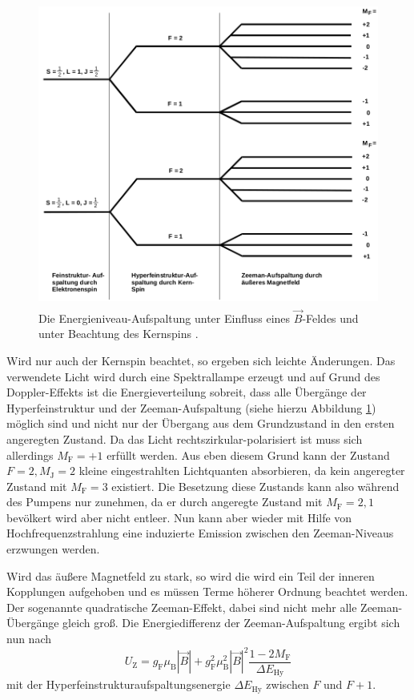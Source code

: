 \begin{figure}
  \centering
  \includegraphics[height=10cm]{content/pictures/Energieniveaus2.png}
  \caption{Die Energieniveau-Aufspaltung unter Einfluss eines $\vec{B}$-Feldes und unter Beachtung des Kernspins \cite{anleitung}.}
  \label{fig:aufspaltung2}
\end{figure}
Wird nur auch der Kernspin beachtet, so ergeben sich leichte Änderungen. Das verwendete Licht wird durch eine Spektrallampe erzeugt und 
auf Grund des Doppler-Effekts ist die Energieverteilung sobreit, dass alle Übergänge der 
Hyperfeinstruktur und der Zeeman-Aufspaltung (siehe hierzu Abbildung \ref{fig:aufspaltung2}) möglich sind und nicht nur der Übergang aus
dem Grundzustand in den ersten angeregten Zustand. Da das Licht rechtszirkular-polarisiert ist
muss sich allerdings $M_\text{F} = +1$ erfüllt werden. Aus eben diesem Grund kann der Zustand $F = 2, M_\text{J} = 2$ kleine
eingestrahlten Lichtquanten absorbieren, da kein angeregter Zustand mit $M_\text{F} = 3$ existiert. Die Besetzung diese Zustands
kann also während des Pumpens nur zunehmen, da er durch angeregte Zustand mit $M_\text{F} = 2, 1$ bevölkert wird aber nicht entleer.
Nun kann aber wieder mit Hilfe von Hochfrequenzstrahlung eine induzierte Emission zwischen den Zeeman-Niveaus erzwungen werden.

Wird das äußere Magnetfeld zu stark, so wird die wird ein Teil der inneren Kopplungen aufgehoben und 
es müssen Terme höherer Ordnung beachtet werden. Der sogenannte quadratische Zeeman-Effekt, dabei sind nicht mehr alle 
Zeeman-Übergänge gleich groß. Die Energiedifferenz der Zeeman-Aufspaltung ergibt sich nun nach
\begin{equation}
  \label{eqn:zeemanquadrat}
  U_\text{Z} = g_\text{F} \mu_\text{B} |\vec{B}| + g_\text{F}^2 \mu_\text{B}^2 |\vec{B}|^2 \frac{1-2 M_\text{F}}{\Delta E_\text{Hy}}
\end{equation}
mit der Hyperfeinstrukturaufspaltungsenergie $\Delta E_\text{Hy}$ zwischen $F$ und $F+1$.

